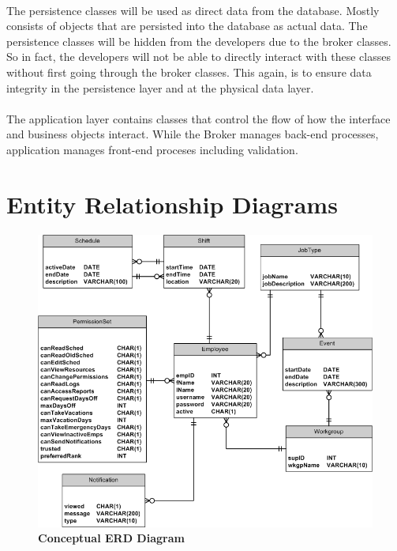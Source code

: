 \documentclass[letterpaper,12pt]{report}
\begin{document}
\paragraph*{}\hspace{0.6cm}The persistence classes will be used as direct data from the database. Mostly consists of objects that are persisted into the database as actual data. The persistence classes will be hidden from the developers due to the broker classes. So in fact, the developers will not be able to directly interact with these classes without first going through the broker classes. This again, is to ensure data integrity in the persistence layer and at the physical data layer.
\paragraph*{}\hspace{0.6cm}The application layer contains classes that control the flow of how the interface and business objects interact. While the Broker manages back-end processes, application manages front-end proceses including validation.
\pagebreak
\section{Entity Relationship Diagrams}
\begin{figure}[ConceptualERD]
 \centering
 \includegraphics[scale=0.6,trim=0mm 10mm 25mm 0mm]{diagrams/WebAgendaERDconceptual.png}
 \caption{\small
\textbf{Conceptual ERD Diagram}}\label{fig:conceptERD}
\end{figure}
\end{document}
